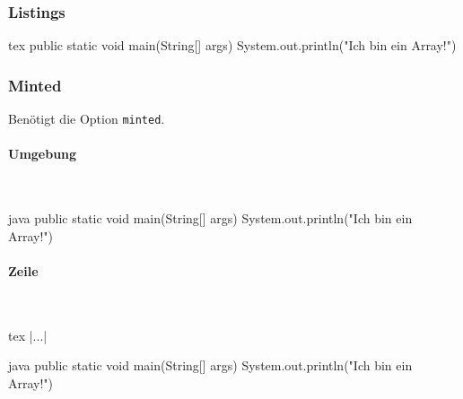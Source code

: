 \subsubsection{Listings}
\begin{listing}[H]
\begin{code}{tex}
    public static void main(String[] args) {
        System.out.println("Ich bin ein Array!")
    }
\end{code}
\end{listing}

\subsubsection{Minted}
Benötigt die Option \texttt{minted}.
\paragraph{Umgebung}~\\
\begin{listing}[H]
\begin{code}[firstnumber=last]{java}
    public static void main(String[] args) {
        System.out.println("Ich bin ein Array!")
    }
\end{code}
\caption{Minted Umgebung}
\label{lst:minted-env}
\end{listing}

\paragraph{Zeile}~\\
\begin{listing}[H]
\begin{code}{tex}
|...|
\end{code}
\caption{Minted Inline}
\label{lst:minted-inline}
\end{listing}

\begin{listing}[H]
\begin{code}{java}
public static void main(String[] args) {
    System.out.println("Ich bin ein Array!")
}
\end{code}
\caption{Java Minted}
\label{lst:minted-java}
\end{listing}